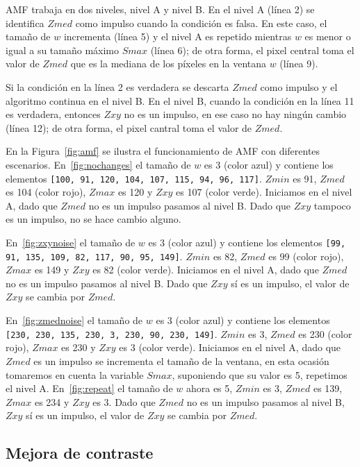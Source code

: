 AMF trabaja en dos niveles, nivel A y nivel B. En el nivel A (línea 2) se
identifica $Zmed$ como impulso cuando la condición es falsa. En este caso, el
tamaño de $w$ incrementa (línea 5) y el nivel A es repetido mientras $w$ es
menor o igual a su tamaño máximo $Smax$ (línea 6); de otra forma, el pixel
central toma el valor de $Zmed$ que es la mediana de los píxeles en la ventana
$w$ (línea 9).

Si la condición en la línea 2 es verdadera se descarta $Zmed$ como impulso y el
algoritmo continua en el nivel B. En el nivel B, cuando la condición en la
línea 11 es verdadera, entonces $Zxy$ no es un impulso, en ese caso no hay
ningún cambio (línea 12); de otra forma, el pixel cantral toma el valor de
$Zmed$.

\shorthandoff{>} %
    
\shorthandon{>} 

En la Figura~\ref{fig:amf} se ilustra el funcionamiento de AMF con diferentes
escenarios. En~\ref{fig:nochanges} el tamaño de $w$ es 3 (color azul) y
contiene los elementos \texttt{[100, 91, 120, 104, 107, 115, 94, 96, 117]}.
$Zmin$ es 91, $Zmed$ es 104 (color rojo), $Zmax$ es 120 y $Zxy$ es 107 (color
verde). Iniciamos en el nivel A, dado que $Zmed$ no es un impulso pasamos al
nivel B. Dado que $Zxy$ tampoco es un impulso, no se hace cambio alguno.

En~\ref{fig:zxynoise} el tamaño de $w$ es 3 (color azul) y contiene los
elementos \texttt{[99, 91, 135, 109, 82, 117, 90, 95, 149]}. $Zmin$ es 82,
$Zmed$ es 99 (color rojo), $Zmax$ es 149 y $Zxy$ es 82 (color verde). Iniciamos
en el nivel A, dado que $Zmed$ no es un impulso pasamos al nivel B. Dado que
$Zxy$ sí es un impulso, el valor de $Zxy$ se cambia por $Zmed$.

En~\ref{fig:zmednoise} el tamaño de $w$ es 3 (color azul) y contiene los
elementos \texttt{[230, 230, 135, 230, 3, 230, 90, 230, 149]}. $Zmin$ es 3,
$Zmed$ es 230 (color rojo), $Zmax$ es 230 y $Zxy$ es 3 (color verde). Iniciamos
en el nivel A, dado que $Zmed$ es un impulso se incrementa el tamaño de la
ventana, en esta ocasión tomaremos en cuenta la variable $Smax$, suponiendo que
su valor es 5, repetimos el nivel A. En~\ref{fig:repeat} el tamaño de $w$ ahora
es 5, $Zmin$ es 3, $Zmed$ es 139, $Zmax$ es 234 y $Zxy$ es 3. Dado que $Zmed$
no es un impulso pasamos al nivel B, $Zxy$ sí es un impulso, el valor de $Zxy$
se cambia por $Zmed$.

\subsection{Mejora de contraste}

